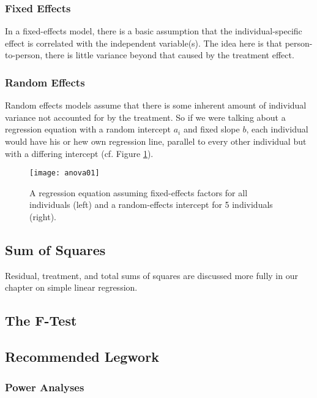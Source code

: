 \subsubsection{Fixed Effects}

In a fixed-effects model, there is a basic assumption that the individual-specific effect is correlated with the independent variable(s). The idea here is that person-to-person, there is little variance beyond that caused by the treatment effect.

\subsubsection{Random Effects}

Random effects models assume that there is some inherent amount of individual variance not accounted for by the treatment. So if we were talking about a regression equation with a random intercept $a_i$ and fixed slope $b$, each individual would have his or hew own regression line, parallel to every other individual but with a differing intercept (cf. Figure \ref{fig:anova01}).

\begin{figure}[h]
\texttt{[image: anova01]}
\caption{A regression equation assuming fixed-effects factors for all individuals (left) and a random-effects intercept for 5 individuals (right).}
\label{fig:anova01}
\end{figure}

\subsection{Sum of Squares}

Residual, treatment, and total sums of squares are discussed more fully in our chapter on simple linear regression.

\subsection{The F-Test}

\subsection{Recommended Legwork}

\subsubsection{Power Analyses}

